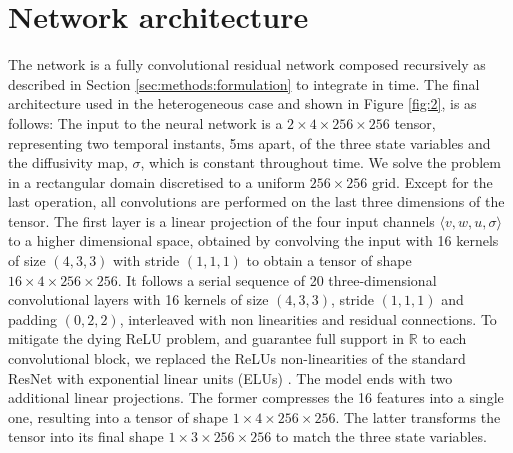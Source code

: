 \documentclass[utf8]{frontiers_suppmat} %
\begin{document}
\onecolumn
{}

\title[Supplementary Material]{{}}
\maketitle


\appendix
\section{Network architecture}
\label{sec:supp:architecture}
The network is a fully convolutional residual network \cite[]{He2016DeepRecognition} composed recursively as described in Section \ref{sec:methods:formulation} to integrate in time.
The final architecture used in the heterogeneous case and shown in Figure \ref{fig:2}, is as follows:
The input to the neural network is a $2 \times 4 \times 256 \times 256$ tensor, representing two temporal instants, 5ms apart, of the three state variables and the diffusivity map, $\sigma$, which is constant throughout time. We solve the problem in a rectangular domain discretised to a uniform $256 \times 256$ grid.
Except for the last operation, all convolutions are performed on the last three dimensions of the tensor.
The first layer is a linear projection of the four input channels $\langle v, w, u, \sigma \rangle$ to a higher dimensional space, obtained by convolving the input with 16 kernels of size $(4, 3, 3)$ with stride $(1, 1, 1)$ to obtain a tensor of shape $16 \times 4 \times 256 \times 256$.
It follows a serial sequence of 20 three-dimensional convolutional layers with 16 kernels of size $(4, 3, 3)$, stride $(1, 1, 1)$ and padding $(0, 2, 2)$, interleaved with non linearities and residual connections.
To mitigate the dying ReLU problem, and guarantee full support in $\mathbb{R}$ to each convolutional block, we replaced the ReLUs non-linearities of the standard ResNet \cite[]{He2016DeepRecognition} with exponential linear units (ELUs) \cite[]{Clevert2016FastELUs}.
The model ends with two additional linear projections. The former compresses the 16 features into a single one, resulting into a tensor of shape $1 \times 4 \times 256 \times 256$.
The latter transforms the tensor into its final shape $1 \times 3 \times 256 \times 256$ to match the three state variables.
\end{document}
